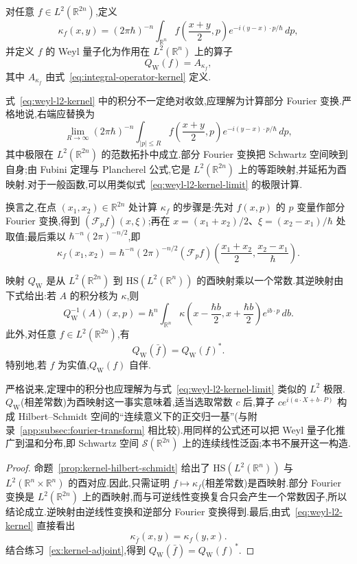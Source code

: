 \begin{definition}\label{def:weyl-l2}
对任意 $f\in L^2(\mathbb R^{2n})$,定义
\[
\kappa_f(x,y)=(2\pi\hbar)^{-n}\int_{\mathbb R^n}
f\left(\frac{x+y}{2},p\right)e^{-i(y-x)\cdot p/\hbar}\,dp,
\label{eq:weyl-l2-kernel}
\]
并定义 $f$ 的 Weyl 量子化为作用在 $L^2(\mathbb R^n)$ 上的算子
\[
Q_{\mathrm W}(f)=A_{\kappa_f},
\]
其中 $A_{\kappa_f}$ 由式~\eqref{eq:integral-operator-kernel} 定义.
\end{definition}

式~\eqref{eq:weyl-l2-kernel} 中的积分不一定绝对收敛,应理解为计算部分 Fourier 变换.严格地说,右端应替换为
\[
\lim_{R\to\infty}(2\pi\hbar)^{-n}
\int_{|p|\leq R}f\left(\frac{x+y}{2},p\right)e^{-i(y-x)\cdot p/\hbar}\,dp,
\label{eq:weyl-l2-kernel-limit}
\]
其中极限在 $L^2(\mathbb R^{2n})$ 的范数拓扑中成立.部分 Fourier 变换把 Schwartz 空间映到自身;由 Fubini 定理与 Plancherel 公式,它是 $L^2(\mathbb R^{2n})$ 上的等距映射,并延拓为酉映射.对于一般函数,可以用类似式~\eqref{eq:weyl-l2-kernel-limit} 的极限计算.

换言之,在点 $(x_1,x_2)\in\mathbb R^{2n}$ 处计算 $\kappa_f$ 的步骤是:先对 $f(x,p)$ 的 $p$ 变量作部分 Fourier 变换,得到 $(\mathcal F_pf)(x,\xi)$;再在 $x=(x_1+x_2)/2$、$\xi=(x_2-x_1)/\hbar$ 处取值;最后乘以 $\hbar^{-n}(2\pi)^{-n/2}$,即
\[
\kappa_f(x_1,x_2)=\hbar^{-n}(2\pi)^{-n/2}
(\mathcal F_pf)\left(\frac{x_1+x_2}{2},\frac{x_2-x_1}{\hbar}\right).
\label{eq:weyl-partial-fourier}
\]

\begin{theorem}\label{thm:weyl-l2-unitary}
映射 $Q_{\mathrm W}$ 是从 $L^2(\mathbb R^{2n})$ 到 $\mathrm{HS}(L^2(\mathbb R^n))$ 的酉映射乘以一个常数.其逆映射由下式给出:若 $A$ 的积分核为 $\kappa$,则
\[
Q_{\mathrm W}^{-1}(A)(x,p)=\hbar^n\int_{\mathbb R^n}
\kappa\left(x-\frac{\hbar b}{2},x+\frac{\hbar b}{2}\right)e^{ib\cdot p}\,db.
\]
此外,对任意 $f\in L^2(\mathbb R^{2n})$,有
\[
Q_{\mathrm W}(\bar f)=Q_{\mathrm W}(f)^*.
\]
特别地,若 $f$ 为实值,$Q_{\mathrm W}(f)$ 自伴.
\end{theorem}

严格说来,定理中的积分也应理解为与式~\eqref{eq:weyl-l2-kernel-limit} 类似的 $L^2$ 极限.$Q_{\mathrm W}$(相差常数)为酉映射这一事实意味着,适当选取常数 $c$ 后,算子 $ce^{i(a\cdot X+b\cdot P)}$ 构成 Hilbert--Schmidt 空间的“连续意义下的正交归一基”(与附录~\ref{app:subsec:fourier-transform} 相比较).用同样的公式还可以把 Weyl 量子化推广到温和分布,即 Schwartz 空间 $\mathcal S(\mathbb R^{2n})$ 上的连续线性泛函;本书不展开这一构造.

\begin{proof}
命题~\ref{prop:kernel-hilbert-schmidt} 给出了 $\mathrm{HS}(L^2(\mathbb R^n))$ 与 $L^2(\mathbb R^n\times\mathbb R^n)$ 的酉对应.因此,只需证明 $f\mapsto\kappa_f$(相差常数)是酉映射.部分 Fourier 变换是 $L^2(\mathbb R^{2n})$ 上的酉映射,而与可逆线性变换复合只会产生一个常数因子,所以结论成立.逆映射由逆线性变换和逆部分 Fourier 变换得到.最后,由式~\eqref{eq:weyl-l2-kernel} 直接看出
\[
\kappa_{\bar f}(x,y)=\kappa_f(y,x).
\]
结合练习~\ref{ex:kernel-adjoint},得到 $Q_{\mathrm W}(\bar f)=Q_{\mathrm W}(f)^*$.
\end{proof}

\ChapterThirteenLater
